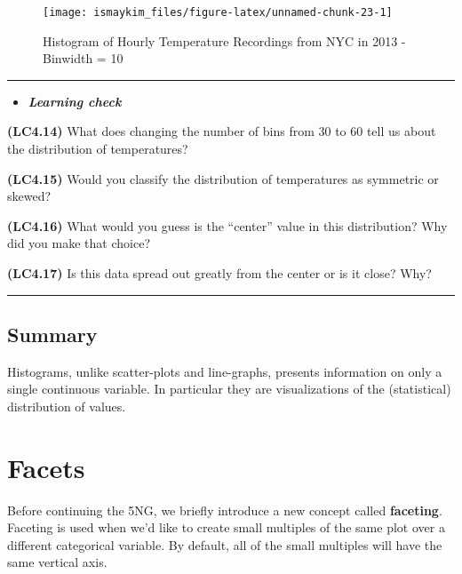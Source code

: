 \documentclass[]{tufte-book}
\let\oldrule=\rule
\renewcommand{\rule}[1]{\oldrule{\linewidth}}
\newenvironment{rmdblock}[1]
  {\begin{shaded*}
  \begin{itemize}
  \renewcommand{\labelitemi}{
    \raisebox{-.7\height}[0pt][0pt]{
    }
  }
  \item
  }
  {
  \end{itemize}
  \end{shaded*}
  }
\newenvironment{learncheck}
  {\begin{rmdblock}{warning}}
  {\end{rmdblock}}
\begin{document}
\begin{figure}

{\centering \texttt{[image: ismaykim\_files/figure-latex/unnamed-chunk-23-1]} 

}

\caption[Histogram of Hourly Temperature Recordings from NYC in 2013 - Binwidth = 10]{Histogram of Hourly Temperature Recordings from NYC in 2013 - Binwidth = 10}\label{fig:unnamed-chunk-23}
\end{figure}

\begin{center}\rule{0.5\linewidth}{\linethickness}\end{center}

\begin{learncheck}
\textbf{\emph{Learning check}}
\end{learncheck}

\textbf{(LC4.14)} What does changing the number of bins from 30 to 60
tell us about the distribution of temperatures?

\textbf{(LC4.15)} Would you classify the distribution of temperatures as
symmetric or skewed?

\textbf{(LC4.16)} What would you guess is the ``center'' value in this
distribution? Why did you make that choice?

\textbf{(LC4.17)} Is this data spread out greatly from the center or is
it close? Why?

\begin{center}\rule{0.5\linewidth}{\linethickness}\end{center}

\subsection{Summary}\label{summary-2}

Histograms, unlike scatter-plots and line-graphs, presents information
on only a single continuous variable. In particular they are
visualizations of the (statistical) distribution of values.

\section{Facets}\label{facets}

Before continuing the 5NG, we briefly introduce a new concept called
\textbf{faceting}. Faceting is used when we'd like to create small
multiples of the same plot over a different categorical variable. By
default, all of the small multiples will have the same vertical axis.
\end{document}
